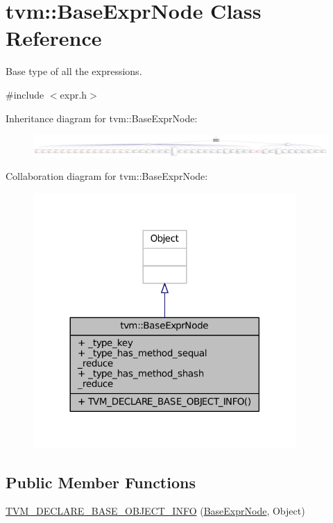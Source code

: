 \hypertarget{classtvm_1_1BaseExprNode}{}\section{tvm\+:\+:Base\+Expr\+Node Class Reference}
\label{classtvm_1_1BaseExprNode}


Base type of all the expressions.  




{\ttfamily \#include $<$expr.\+h$>$}



Inheritance diagram for tvm\+:\+:Base\+Expr\+Node\+:
\nopagebreak
\begin{figure}[H]
\begin{center}
\leavevmode
\includegraphics[width=350pt]{classtvm_1_1BaseExprNode__inherit__graph}
\end{center}
\end{figure}


Collaboration diagram for tvm\+:\+:Base\+Expr\+Node\+:
\nopagebreak
\begin{figure}[H]
\begin{center}
\leavevmode
\includegraphics[width=284pt]{classtvm_1_1BaseExprNode__coll__graph}
\end{center}
\end{figure}
\subsection*{Public Member Functions}
\begin{DoxyCompactItemize}
\item 
\hyperlink{classtvm_1_1BaseExprNode_a831794c879d47c30cdd9cefd4f05d533}{T\+V\+M\+\_\+\+D\+E\+C\+L\+A\+R\+E\+\_\+\+B\+A\+S\+E\+\_\+\+O\+B\+J\+E\+C\+T\+\_\+\+I\+N\+FO} (\hyperlink{classtvm_1_1BaseExprNode}{Base\+Expr\+Node}, Object)
\end{DoxyCompactItemize}
